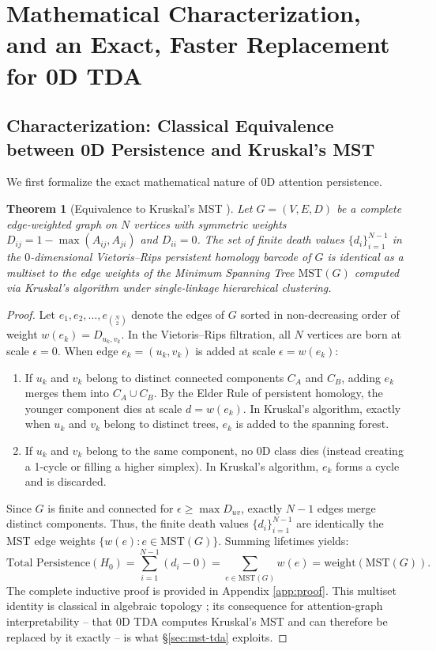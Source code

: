 \documentclass{article}
\newtheorem{theorem}{Theorem}
\begin{document}
\section{Mathematical Characterization, and an Exact, Faster Replacement for 0D TDA}
\label{sec:method}

\subsection{Characterization: Classical Equivalence between 0D Persistence and Kruskal's MST}
We first formalize the exact mathematical nature of $0$D attention persistence.

\begin{theorem}[Equivalence to Kruskal's MST \citep{gower1969, edelsbrunner2010, carlsson2009}]
\label{thm:mst}
Let $G = (V, E, D)$ be a complete edge-weighted graph on $N$ vertices with symmetric weights $D_{ij} = 1 - \max(A_{ij}, A_{ji})$ and $D_{ii} = 0$. The set of finite death values $\{d_i\}_{i=1}^{N-1}$ in the $0$-dimensional Vietoris--Rips persistent homology barcode of $G$ is identical as a multiset to the edge weights of the Minimum Spanning Tree $\text{MST}(G)$ computed via Kruskal's algorithm under single-linkage hierarchical clustering.
\end{theorem}

\begin{proof}
Let $e_1, e_2, \dots, e_{\binom{N}{2}}$ denote the edges of $G$ sorted in non-decreasing order of weight $w(e_k) = D_{u_k, v_k}$. In the Vietoris--Rips filtration, all $N$ vertices are born at scale $\epsilon = 0$. When edge $e_k = (u_k, v_k)$ is added at scale $\epsilon = w(e_k)$:
\begin{enumerate}
    \item If $u_k$ and $v_k$ belong to distinct connected components $C_A$ and $C_B$, adding $e_k$ merges them into $C_A \cup C_B$. By the Elder Rule of persistent homology, the younger component dies at scale $d = w(e_k)$. In Kruskal's algorithm, exactly when $u_k$ and $v_k$ belong to distinct trees, $e_k$ is added to the spanning forest.
    \item If $u_k$ and $v_k$ belong to the same component, no $0$D class dies (instead creating a 1-cycle or filling a higher simplex). In Kruskal's algorithm, $e_k$ forms a cycle and is discarded.
\end{enumerate}
Since $G$ is finite and connected for $\epsilon \ge \max D_{uv}$, exactly $N-1$ edges merge distinct components. Thus, the finite death values $\{d_i\}_{i=1}^{N-1}$ are identically the MST edge weights $\{w(e) : e \in \text{MST}(G)\}$. Summing lifetimes yields:
\begin{equation}
    \text{Total Persistence}(H_0) = \sum_{i=1}^{N-1} (d_i - 0) = \sum_{e \in \text{MST}(G)} w(e) = \text{weight}(\text{MST}(G)).
\end{equation}
The complete inductive proof is provided in Appendix \ref{app:proof}. This multiset identity is classical in algebraic topology \citep{gower1969, edelsbrunner2010}; its consequence for attention-graph interpretability -- that $0$D TDA computes Kruskal's MST and can therefore be replaced by it exactly -- is what \S\ref{sec:mst-tda} exploits.
\end{proof}
\end{document}
